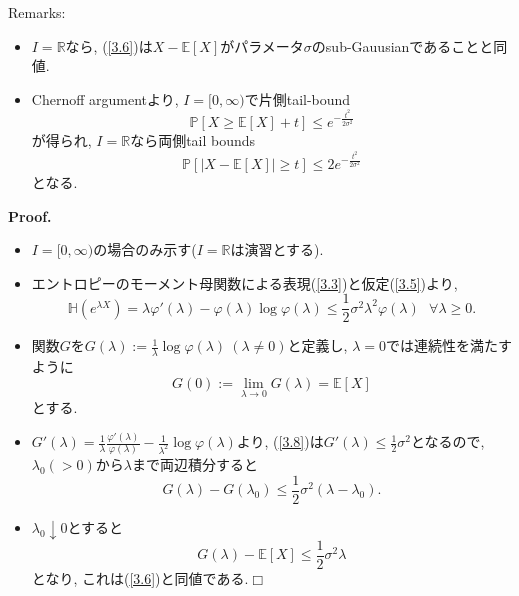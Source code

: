 \documentclass[aspectratio=169, dvipdfmx]{beamer}
\def\qed{\hfill $\Box$}
\newcommand{\ex}{\mathbb{E}}
\begin{document}
\begin{frame}{}
Remarks:
\begin{itemize}
    \item $I = \mathbb{R}$なら, (\ref{3.6})は$X-\ex[X]$がパラメータ$\sigma$のsub-Gauusianであることと同値.
    \item Chernoff argumentより, $I = [0, \infty)$で片側tail-bound
    \[ \mathbb{P}[X \ge \ex[X]+t] \le e^{-\frac{t^2}{2\sigma^2}} \tag{3.7}\label{3.7}\]
    が得られ, $I=\mathbb{R}$なら両側tail bounds
    \[ \mathbb{P}[|X-\ex[X]|\ge t] \le 2e^{-\frac{t^2}{2\sigma^2}}\]
    となる.
\end{itemize}
\end{frame}

\begin{frame}{}{} 
{\bf Proof.}
\begin{itemize}
    \item $I = [0,\infty)$の場合のみ示す($I=\mathbb{R}$は演習とする).
    \item エントロピーのモーメント母関数による表現(\ref{3.3})と仮定(\ref{3.5})より,
    \[\mathbb{H}(e^{\lambda X}) = \lambda \varphi'(\lambda) - \varphi(\lambda)\log\varphi(\lambda)\le\frac{1}{2}\sigma^2\lambda^2\varphi(\lambda) \ \ \ \forall \lambda \ge 0.\tag{3.8}\label{3.8} \]
    \item 関数$G$を$G(\lambda):= \frac{1}{\lambda}\log\varphi(\lambda)\ (\lambda\ne 0)$と定義し, $\lambda=0$では連続性を満たすように
    \[ G(0):= \lim_{\lambda \to 0}G(\lambda) = \ex[X] \tag{3.9}\label{3.9}\]
    とする.
    \item $G'(\lambda) = \frac{1}{\lambda}\frac{\varphi'(\lambda)}{\varphi(\lambda)}-\frac{1}{\lambda^2}\log\varphi(\lambda)$より, (\ref{3.8})は$G'(\lambda) \le \frac{1}{2}\sigma^2$となるので, $\lambda_0(>0)$から$\lambda$まで両辺積分すると
    \[ G(\lambda) - G(\lambda_0) \le \frac{1}{2}\sigma^2(\lambda-\lambda_0). \]
    \item $\lambda_0 \downarrow 0$とすると
    \[ G(\lambda) - \ex[X] \le \frac{1}{2}\sigma^2\lambda \]
    となり, これは(\ref{3.6})と同値である.\qed
\end{itemize}
\end{frame}
\end{document}
